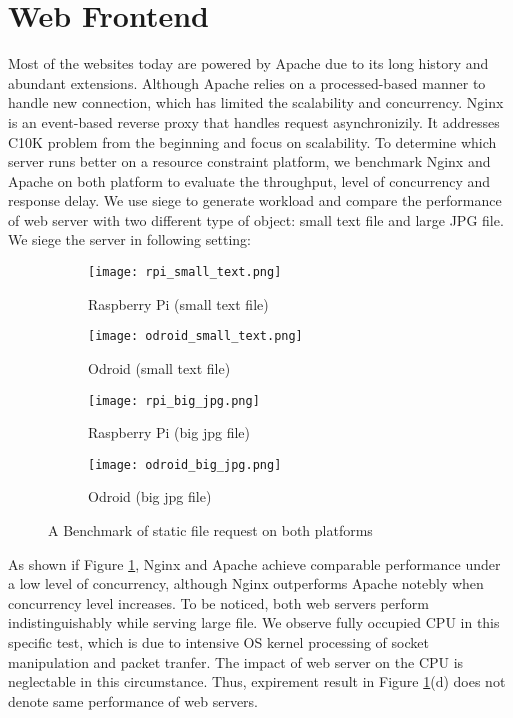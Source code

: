 \section{Web Frontend}
Most of the websites today are powered by Apache due to its long history and abundant extensions. Although Apache relies on a processed-based manner to handle new connection, which has limited the scalability and concurrency. Nginx is an event-based reverse proxy that handles request asynchronizily. It addresses C10K problem from the beginning and focus on scalability.
To determine which server runs better on a resource constraint platform, we benchmark Nginx and Apache on both platform to evaluate the throughput, level of concurrency and response delay. We use siege to generate workload and compare the performance of web server with two different type of object: small text file and large JPG file.
We siege the server in following setting:

\begin{figure}[h]
\centering
\begin{subfigure}{0.45\textwidth}
\centering
\texttt{[image: rpi\_small\_text.png]}
\caption{Raspberry Pi (small text file)}
\end{subfigure}
\begin{subfigure}{0.45\textwidth}
\centering
\texttt{[image: odroid\_small\_text.png]}
\caption{Odroid (small text file)}
\end{subfigure}

\begin{subfigure}{0.45\textwidth}
\centering
\texttt{[image: rpi\_big\_jpg.png]}
\caption{Raspberry Pi (big jpg file)}
\end{subfigure}
\begin{subfigure}{0.45\textwidth}
\centering
\texttt{[image: odroid\_big\_jpg.png]}
\caption{Odroid (big jpg file)}
\end{subfigure}

\caption{A Benchmark of static file request on both platforms}
\label{static}
\end{figure}
As shown if Figure \ref{static}, Nginx and Apache achieve comparable performance under a low level of concurrency, although Nginx outperforms Apache notebly when concurrency level increases. To be noticed, both web servers perform indistinguishably while serving large file. We observe fully occupied CPU in this specific test, which is due to intensive OS kernel processing of socket manipulation and packet tranfer. The impact of web server on the CPU is neglectable in this circumstance. Thus, expirement result in Figure \ref{static}(d) does not denote same performance of web servers.

